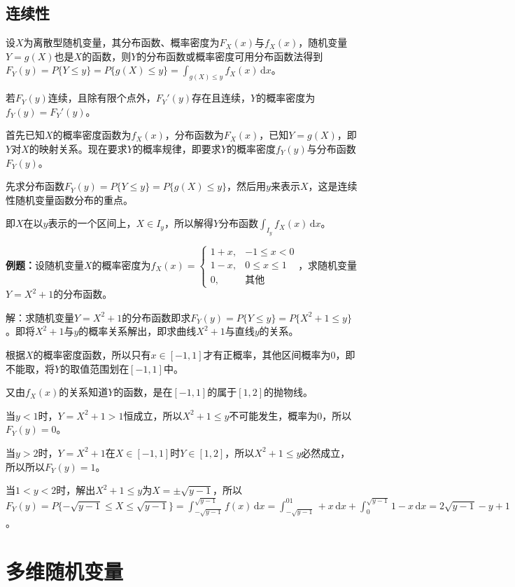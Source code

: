 \subsection{连续性}

设$X$为离散型随机变量，其分布函数、概率密度为$F_X(x)$与$f_X(x)$，随机变量$Y=g(X)$也是$X$的函数，则$Y$的分布函数或概率密度可用分布函数法得到$F_Y(y)=P\{Y\leqslant y\}=P\{g(X)\leqslant y\}=\int_{g(X)\leqslant y}f_X(x)\,\textrm{d}x$。

若$F_Y(y)$连续，且除有限个点外，$F_Y'(y)$存在且连续，$Y$的概率密度为$f_Y(y)=F_Y'(y)$。

首先已知$X$的概率密度函数为$f_X(x)$，分布函数为$F_X(x)$，已知$Y=g(X)$，即$Y$对$X$的映射关系。现在要求$Y$的概率规律，即要求$Y$的概率密度$f_Y(y)$与分布函数$F_Y(y)$。

先求分布函数$F_Y(y)=P\{Y\leqslant y\}=P\{g(X)\leqslant y\}$，然后用$y$来表示$X$，这是连续性随机变量函数分布的重点。

即$X$在以$y$表示的一个区间上，$X\in I_y$，所以解得$Y$分布函数$\int_{I_y}f_X(x)\,\textrm{d}x$。

\textbf{例题：}设随机变量$X$的概率密度为$f_X(x)=\left\{\begin{array}{ll}
    1+x, & -1\leqslant x<0 \\
    1-x, & 0\leqslant x\leqslant1 \\
    0, & \text{其他}
\end{array}\right.$，求随机变量$Y=X^2+1$的分布函数。

解：求随机变量$Y=X^2+1$的分布函数即求$F_Y(y)=P\{Y\leqslant y\}=P\{X^2+1\leqslant y\}$。即将$X^2+1$与$y$的概率关系解出，即求曲线$X^2+1$与直线$y$的关系。

根据$X$的概率密度函数，所以只有$x\in [-1,1]$才有正概率，其他区间概率为0，即不能取，将$Y$的取值范围划在$[-1,1]$中。

又由$f_X(x)$的关系知道$Y$的函数，是在$[-1,1]$的属于$[1,2]$的抛物线。

当$y<1$时，$Y=X^2+1>1$恒成立，所以$X^2+1\leqslant y$不可能发生，概率为0，所以$F_Y(y)=0$。

当$y>2$时，$Y=X^2+1$在$X\in[-1,1]$时$Y\in[1,2]$，所以$X^2+1\leqslant y$必然成立，所以所以$F_Y(y)=1$。

当$1<y<2$时，解出$X^2+1\leqslant y$为$X=\pm\sqrt{y-1}$，所以$F_Y(y)=P\{-\sqrt{y-1}\leqslant X\leqslant\sqrt{y-1}\}=\int_{-\sqrt{y-1}}^{\sqrt{y-1}}f(x)\,\textrm{d}x=\int_{-\sqrt{y-1}}^01+x\,\textrm{d}x+\int_0^{\sqrt{y-1}}1-x\,\textrm{d}x=2\sqrt{y-1}-y+1$。

\section{多维随机变量}

